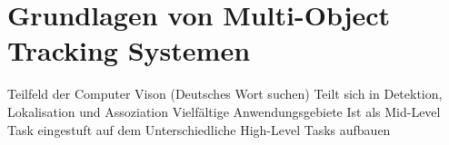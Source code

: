 \section{Grundlagen von Multi-Object Tracking Systemen}
Teilfeld der Computer Vison (Deutsches Wort suchen)
Teilt sich in Detektion, Lokalisation und Assoziation 
Vielfältige Anwendungsgebiete
Ist als Mid-Level Task eingestuft auf dem Unterschiedliche High-Level Tasks aufbauen
